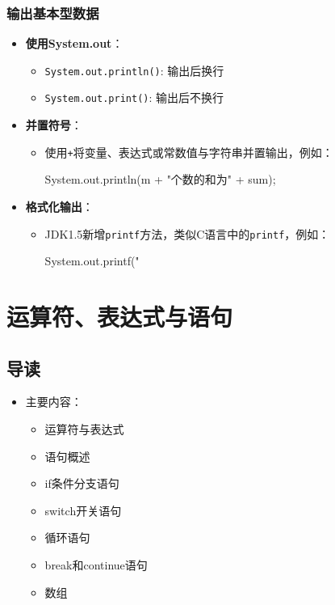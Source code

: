 \documentclass[a4paper, 10pt]{ctexart}
\begin{document}
\subsubsection{输出基本型数据}
\begin{itemize}
  \item \textbf{使用System.out}：
  \begin{itemize}
    \item \texttt{System.out.println()}: 输出后换行
    \item \texttt{System.out.print()}: 输出后不换行
  \end{itemize}
  \item \textbf{并置符号}：
  \begin{itemize}
    \item 使用\texttt{+}将变量、表达式或常数值与字符串并置输出，例如：
    \begin{codeblock}
System.out.println(m + "个数的和为" + sum);
    \end{codeblock}
  \end{itemize}
  \item \textbf{格式化输出}：
  \begin{itemize}
    \item JDK1.5新增\texttt{printf}方法，类似C语言中的\texttt{printf}，例如：
    \begin{codeblock}
System.out.printf("%
    \end{codeblock}
  \end{itemize}
\end{itemize}

\section{运算符、表达式与语句}

\subsection{导读}
\begin{itemize}
  \item 主要内容：
  \begin{itemize}
    \item 运算符与表达式
    \item 语句概述
    \item if条件分支语句
    \item switch开关语句
    \item 循环语句
    \item break和continue语句
    \item 数组
  \end{itemize}
\end{itemize}
\end{document}
